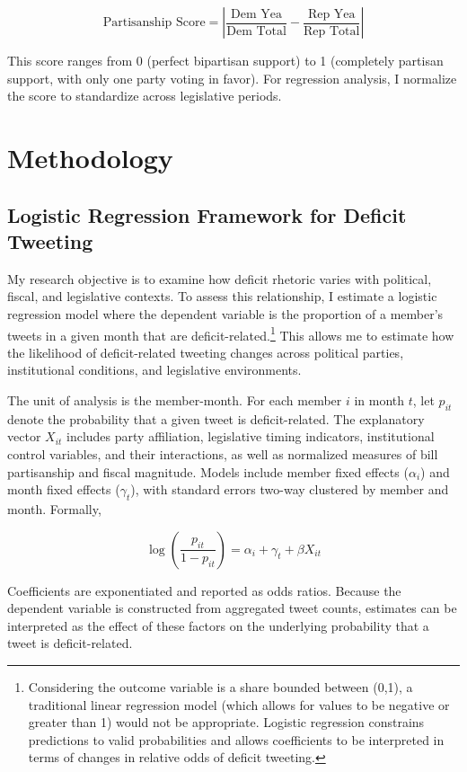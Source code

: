 \documentclass[
  12pt,
]{article}
\begin{document}
\[
\text{Partisanship Score}
= \left|
\frac{\text{Dem Yea}}{\text{Dem Total}}
-
\frac{\text{Rep Yea}}{\text{Rep Total}}
\right|
\]

This score ranges from 0 (perfect bipartisan support) to 1 (completely
partisan support, with only one party voting in favor). For regression
analysis, I normalize the score to standardize across legislative
periods.

\section{Methodology}\label{methodology}

\subsection{Logistic Regression Framework for Deficit
Tweeting}\label{logistic-regression-framework-for-deficit-tweeting}

My research objective is to examine how deficit rhetoric varies with
political, fiscal, and legislative contexts. To assess this
relationship, I estimate a logistic regression model where the dependent
variable is the proportion of a member's tweets in a given month that
are deficit-related.\footnote{Considering the outcome variable is a
  share bounded between (0,1), a traditional linear regression model
  (which allows for values to be negative or greater than 1) would not
  be appropriate. Logistic regression constrains predictions to valid
  probabilities and allows coefficients to be interpreted in terms of
  changes in relative odds of deficit tweeting.} This allows me to
estimate how the likelihood of deficit-related tweeting changes across
political parties, institutional conditions, and legislative
environments.

The unit of analysis is the member-month. For each member \(i\) in month
\(t\), let \(p_{it}\) denote the probability that a given tweet is
deficit-related. The explanatory vector \(X_{it}\) includes party
affiliation, legislative timing indicators, institutional control
variables, and their interactions, as well as normalized measures of
bill partisanship and fiscal magnitude. Models include member fixed
effects (\(\alpha_i\)) and month fixed effects (\(\gamma_t\)), with
standard errors two-way clustered by member and month. Formally,

\[
\log\left(\frac{p_{it}}{1 - p_{it}}\right) = \alpha_i + \gamma_t + \beta X_{it}
\]

Coefficients are exponentiated and reported as odds ratios. Because the
dependent variable is constructed from aggregated tweet counts,
estimates can be interpreted as the effect of these factors on the
underlying probability that a tweet is deficit-related.
\end{document}
